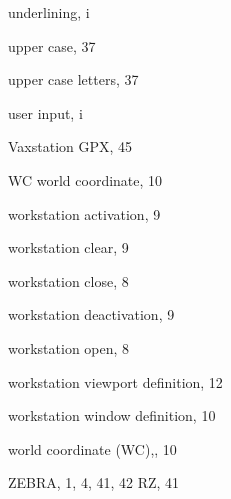 \begin{theindex}
  \indexspace
 
  \item underlining, i
  \item upper case, 37
  \item upper case letters, 37
  \item user input, i
 
  \indexspace
 
  \item Vaxstation GPX, 45
 
  \indexspace
 
  \item WC
    \subitem world coordinate, 10
  \item workstation activation, 9
  \item workstation clear, 9
  \item workstation close, 8
  \item workstation deactivation, 9
  \item workstation open, 8
  \item workstation viewport definition, 12
  \item workstation window definition, 10
  \item world coordinate (WC),, 10
 
  \indexspace
 
  \item ZEBRA, 1, 4, 41, 42
    \subitem RZ, 41
 
\end{theindex}
